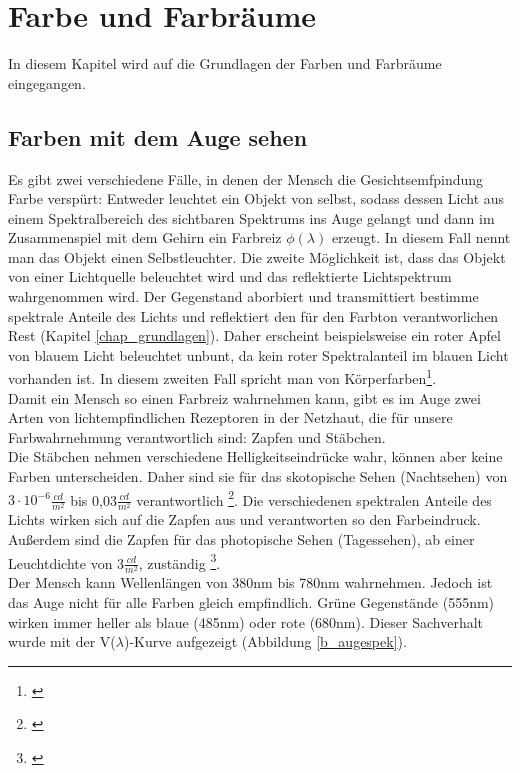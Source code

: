 \chapter{Farbe und Farbräume}
In diesem Kapitel wird auf die Grundlagen der Farben und Farbräume eingegangen.

\section{Farben mit dem Auge sehen} \label{sec_auge}

Es gibt zwei verschiedene Fälle, in denen der Mensch die Gesichtsemfpindung Farbe verspürt: Entweder leuchtet ein Objekt von selbst, sodass dessen Licht aus einem Spektralbereich des sichtbaren Spektrums ins Auge gelangt und dann im Zusammenspiel mit dem Gehirn ein Farbreiz $\phi(\lambda)$ erzeugt. In diesem Fall nennt man das Objekt einen Selbstleuchter. Die zweite Möglichkeit ist, dass das Objekt von einer Lichtquelle beleuchtet wird und das reflektierte Lichtspektrum wahrgenommen wird. Der Gegenstand aborbiert und transmittiert bestimme spektrale Anteile des Lichts und reflektiert den für den Farbton verantworlichen Rest (Kapitel \ref{chap_grundlagen}). Daher erscheint beispielsweise ein roter Apfel von blauem Licht beleuchtet unbunt, da kein roter Spektralanteil im blauen Licht vorhanden ist.
In diesem zweiten Fall spricht man von Körperfarben\footnote{\cite[103]{hentschel}}.\\     
Damit ein Mensch so einen Farbreiz wahrnehmen kann, gibt es im Auge zwei Arten von lichtempfindlichen Rezeptoren in der Netzhaut, die für unsere Farbwahrnehmung verantwortlich sind: Zapfen und Stäbchen.\\
Die Stäbchen nehmen verschiedene Helligkeitseindrücke wahr, können aber keine Farben unterscheiden. Daher sind sie für das skotopische Sehen (Nachtsehen) von $3 \cdot 10^{-6} \frac{cd}{m^{2}}$ bis 0,03$\frac{cd}{m^{2}}$ verantwortlich \footnote{\cite{doccheck sko}}.
Die verschiedenen spektralen Anteile des Lichts wirken sich auf die Zapfen aus und verantworten so den Farbeindruck. Außerdem sind die Zapfen für das photopische Sehen (Tagessehen), ab einer Leuchtdichte von 3$\frac{cd}{m^{2}}$, zuständig \footnote{\cite{doccheck pho}}.\\
Der Mensch kann Wellenlängen von 380nm bis 780nm wahrnehmen. Jedoch ist das Auge nicht für alle Farben gleich empfindlich. Grüne Gegenstände (555nm) wirken immer heller als blaue (485nm) oder rote (680nm). Dieser Sachverhalt wurde mit der V($\lambda$)-Kurve  aufgezeigt (Abbildung \ref{b_augespek}).
 

